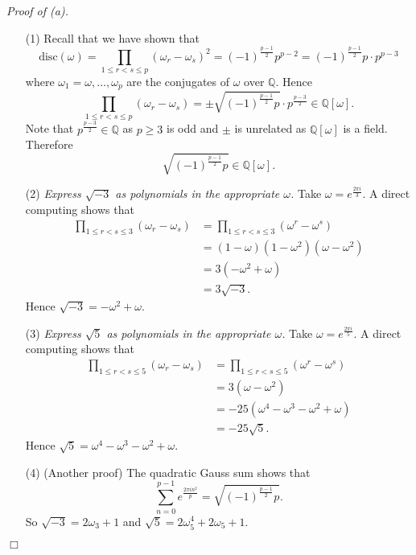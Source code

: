 \documentclass{article}
\begin{document}
\emph{Proof of (a).}
\begin{enumerate}
\item[(1)]
  Recall that we have shown that
  \[
    \mathrm{disc}(\omega)
    = \prod_{1 \leq r < s \leq p}(\omega_r - \omega_s)^2
    = (-1)^{\frac{p-1}{2}} p^{p-2}
    = (-1)^{\frac{p-1}{2}} p \cdot p^{p-3}
  \]
  where $\omega_1 = \omega, \ldots, \omega_p$ are the conjugates of $\omega$ over $\mathbb{Q}$.
  Hence
  \[
    \prod_{1 \leq r < s \leq p}(\omega_r - \omega_s)
    = \pm \sqrt{(-1)^{\frac{p-1}{2}} p} \cdot p^{\frac{p-3}{2}}
   \in \mathbb{Q}[\omega].
  \]
  Note that $p^{\frac{p-3}{2}} \in \mathbb{Q}$ as $p \geq 3$ is odd
  and $\pm$ is unrelated as $\mathbb{Q}[\omega]$ is a field.
  Therefore
  \[
    \sqrt{(-1)^{\frac{p-1}{2}} p} \in \mathbb{Q}[\omega].
  \]

\item[(2)]
  \emph{Express $\sqrt{-3}$ as polynomials in the appropriate $\omega$.}
  Take $\omega = e^{\frac{2\pi i}{3}}$.
  A direct computing shows that
  \begin{align*}
    \prod_{1 \leq r < s \leq 3}(\omega_r - \omega_s)
    &= \prod_{1 \leq r < s \leq 3}(\omega^r - \omega^s) \\
    &= (1-\omega)(1-\omega^2)(\omega-\omega^2) \\
    &= 3(-\omega^2 + \omega) \\
    &= 3 \sqrt{-3}.
  \end{align*}
  Hence $\sqrt{-3} = -\omega^2 + \omega$.

\item[(3)]
  \emph{Express $\sqrt{5}$ as polynomials in the appropriate $\omega$.}
  Take $\omega = e^{\frac{2\pi i}{5}}$.
  A direct computing shows that
  \begin{align*}
    \prod_{1 \leq r < s \leq 5}(\omega_r - \omega_s)
    &= \prod_{1 \leq r < s \leq 5}(\omega^r - \omega^s) \\
    &= 3(\omega - \omega^2) \\
    &= -25(\omega^4 - \omega^3 - \omega^2 + \omega) \\
    &= -25 \sqrt{5}.
  \end{align*}
  Hence $\sqrt{5} = \omega^4 - \omega^3 - \omega^2 + \omega$.

\item[(4)]
  (Another proof)
  The quadratic Gauss sum shows that
  \[
    \sum_{n=0}^{p-1} e^{\frac{2\pi i n^2}{p}} = \sqrt{(-1)^{\frac{p-1}{2}} p}.
  \]
  So $\sqrt{-3} = 2\omega_3 + 1$ and $\sqrt{5} = 2\omega^4_5 + 2\omega_5 + 1$.
\end{enumerate}
$\Box$ \\
\end{document}
